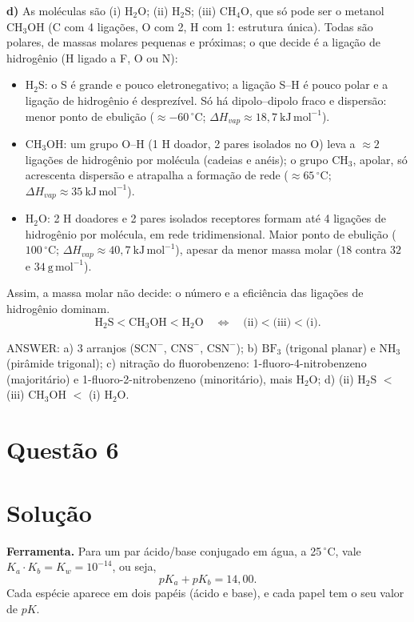 \documentclass{article}%
\begin{document}
\medskip
\textbf{d)} As moléculas são (i) $\mathrm{H_2O}$; (ii) $\mathrm{H_2S}$; (iii) $\mathrm{CH_4O}$, que só pode ser o metanol $\mathrm{CH_3OH}$ (C com 4 ligações, O com 2, H com 1: estrutura única). Todas são polares, de massas molares pequenas e próximas; o que decide é a ligação de hidrogênio (H ligado a F, O ou N):
\begin{itemize}
\item $\mathrm{H_2S}$: o S é grande e pouco eletronegativo; a ligação S--H é pouco polar e a ligação de hidrogênio é desprezível. Só há dipolo--dipolo fraco e dispersão: menor ponto de ebulição ($\approx-60\,^\circ\mathrm{C}$; $\Delta H_{vap}\approx18{,}7\ \mathrm{kJ\,mol^{-1}}$).
\item $\mathrm{CH_3OH}$: um grupo O--H (1 H doador, 2 pares isolados no O) leva a $\approx2$ ligações de hidrogênio por molécula (cadeias e anéis); o grupo $\mathrm{CH_3}$, apolar, só acrescenta dispersão e atrapalha a formação de rede ($\approx65\,^\circ\mathrm{C}$; $\Delta H_{vap}\approx35\ \mathrm{kJ\,mol^{-1}}$).
\item $\mathrm{H_2O}$: 2 H doadores e 2 pares isolados receptores formam até 4 ligações de hidrogênio por molécula, em rede tridimensional. Maior ponto de ebulição ($100\,^\circ\mathrm{C}$; $\Delta H_{vap}\approx40{,}7\ \mathrm{kJ\,mol^{-1}}$), apesar da menor massa molar ($18$ contra $32$ e $34\ \mathrm{g\,mol^{-1}}$).
\end{itemize}
Assim, a massa molar não decide: o número e a eficiência das ligações de hidrogênio dominam.
\[
\mathrm{H_2S} < \mathrm{CH_3OH} < \mathrm{H_2O}\quad\Longleftrightarrow\quad \text{(ii)} < \text{(iii)} < \text{(i)}.
\]

\medskip
\noindent ANSWER: a) 3 arranjos ($\mathrm{SCN^-}$, $\mathrm{CNS^-}$, $\mathrm{CSN^-}$); b) $\mathrm{BF_3}$ (trigonal planar) e $\mathrm{NH_3}$ (pirâmide trigonal); c) nitração do fluorobenzeno: 1-fluoro-4-nitrobenzeno (majoritário) e 1-fluoro-2-nitrobenzeno (minoritário), mais $\mathrm{H_2O}$; d) (ii) $\mathrm{H_2S}$ $<$ (iii) $\mathrm{CH_3OH}$ $<$ (i) $\mathrm{H_2O}$.%
\newpage%
\section*{Questão 6}

\section*{Solução}

\textbf{Ferramenta.} Para um par ácido/base conjugado em água, a 25\,$^\circ$C, vale $K_a\cdot K_b=K_w=10^{-14}$, ou seja,
\[
pK_a+pK_b=14{,}00 .
\]
Cada espécie aparece em dois papéis (ácido e base), e cada papel tem o seu valor de $pK$.
\end{document}
